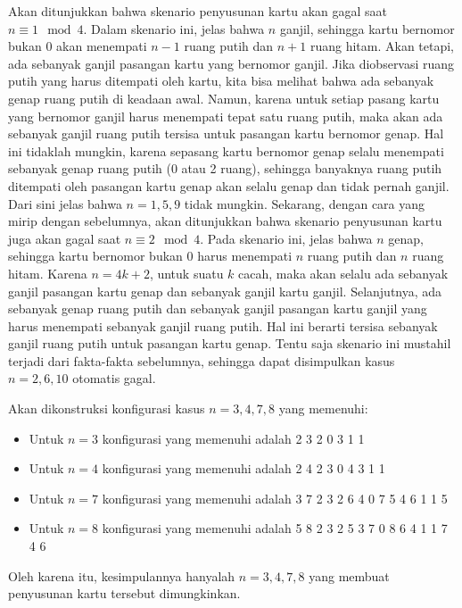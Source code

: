 \documentclass[12pt]{scrartcl}
\begin{document}
\begin{soaljawab}
\begin{solusi}
        \vspace{10pt}
        Akan ditunjukkan bahwa skenario penyusunan kartu akan gagal saat $n \equiv 1 \mod 4$. Dalam skenario ini, jelas bahwa $n$ ganjil, sehingga kartu bernomor bukan 0 akan menempati $n-1$ ruang putih dan $n+1$ ruang hitam. Akan tetapi, ada sebanyak ganjil pasangan kartu yang bernomor ganjil. Jika diobservasi ruang putih yang harus ditempati oleh kartu, kita bisa melihat bahwa ada sebanyak genap ruang putih di keadaan awal. Namun, karena untuk setiap pasang kartu yang bernomor ganjil harus menempati tepat satu ruang putih, maka akan ada sebanyak ganjil ruang putih tersisa untuk pasangan kartu bernomor genap. Hal ini tidaklah mungkin, karena sepasang kartu bernomor genap selalu menempati sebanyak genap ruang putih (0 atau 2 ruang), sehingga banyaknya ruang putih ditempati oleh pasangan kartu genap akan selalu genap dan tidak pernah ganjil. Dari sini jelas bahwa $n=1,5,9$ tidak mungkin.
        \vspace{10pt}
        Sekarang, dengan cara yang mirip dengan sebelumnya, akan ditunjukkan bahwa skenario penyusunan kartu juga akan gagal saat $n \equiv 2 \mod 4$. Pada skenario ini, jelas bahwa $n$ genap, sehingga kartu bernomor bukan 0 harus menempati $n$ ruang putih dan $n$ ruang hitam. Karena $n=4k+2$, untuk suatu $k$ cacah, maka akan selalu ada sebanyak ganjil pasangan kartu genap dan sebanyak ganjil kartu ganjil. Selanjutnya, ada sebanyak genap ruang putih dan sebanyak ganjil pasangan kartu ganjil yang harus menempati sebanyak ganjil ruang putih. Hal ini berarti tersisa sebanyak ganjil ruang putih untuk pasangan kartu genap. Tentu saja skenario ini mustahil terjadi dari fakta-fakta sebelumnya, sehingga dapat disimpulkan kasus $n=2,6,10$ otomatis gagal.

        Akan dikonstruksi konfigurasi kasus $n=3,4,7,8$ yang memenuhi:
        \begin{itemize}
            \item Untuk $n=3$ konfigurasi yang memenuhi adalah 2 3 2 0 3 1 1
            \item Untuk $n=4$ konfigurasi yang memenuhi adalah 2 4 2 3 0 4 3 1 1
            \item Untuk $n=7$ konfigurasi yang memenuhi adalah 3 7 2 3 2 6 4 0 7 5 4 6 1 1 5
            \item Untuk $n=8$ konfigurasi yang memenuhi adalah 5 8 2 3 2 5 3 7 0 8 6 4 1 1 7 4 6
        \end{itemize}
        Oleh karena itu, kesimpulannya hanyalah $n=3,4,7,8$ yang membuat penyusunan kartu tersebut dimungkinkan.
    \end{solusi}
\end{soaljawab}
\end{document}

